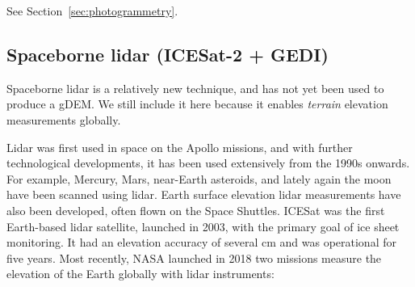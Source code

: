 See Section~\ref{sec:photogrammetry}.




\subsection{Spaceborne lidar (ICESat-2 + GEDI)}
Spaceborne lidar is a relatively new technique, and has not yet been used to produce a gDEM.
We still include it here because it enables \emph{terrain} elevation measurements globally.

Lidar was first used in space on the Apollo missions, and with further technological developments, it has been used extensively from the 1990s onwards.
For example, Mercury, Mars, near-Earth asteroids, and lately again the moon have been scanned using lidar.
Earth surface elevation lidar measurements have also been developed, often flown on the Space Shuttles.
ICESat was the first Earth-based lidar satellite, launched in 2003, with the primary goal of ice sheet monitoring.
It had an elevation accuracy of several cm and was operational for five years.
Most recently, NASA launched in 2018 two missions measure the elevation of the Earth globally with lidar instruments:

